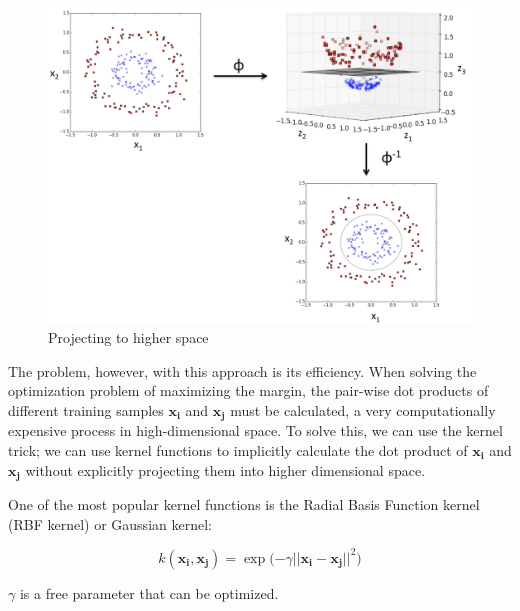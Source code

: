 \documentclass{article}
\begin{document}
\begin{figure}[h!]
\centering
\includegraphics[scale=0.18]{dimensions.jpg}
\caption{Projecting to higher space}
\label{fig:mapping}
\end{figure}
The problem, however, with this approach is its efficiency. When solving the optimization problem of maximizing the margin, the pair-wise dot products of different training samples $\bm{x_i}$ and $\bm{x_j}$ must be calculated, a very computationally expensive process in high-dimensional space. To solve this, we can use the kernel trick; we can use kernel functions to implicitly calculate the dot product of $\bm{x_i}$ and $\bm{x_j}$ without explicitly projecting them into higher dimensional space. 

One of the most popular kernel functions is the Radial Basis Function kernel (RBF kernel) or Gaussian kernel:

\[ k(\bm{x_i}, \bm{x_j}) = \exp{(-\gamma||\bm{x_i}-\bm{x_j}||^2}) \]

$\gamma$ is a free parameter that can be optimized.
\end{document}
